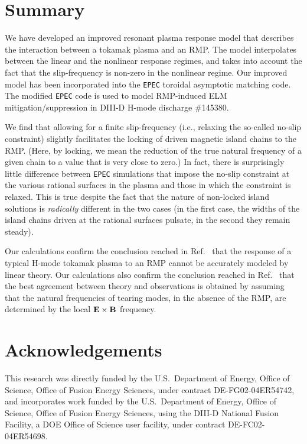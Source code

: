 \documentclass[12pt,prb,aps]{revtex4-1}
\begin{document}
\section{Summary}
We have developed an improved resonant plasma response model that describes the interaction between a tokamak plasma and an RMP. 
The model interpolates between the linear and the nonlinear response regimes, and takes into account the fact that the slip-frequency
is non-zero in the nonlinear regime. Our improved model has been incorporated into the {\tt EPEC} toroidal asymptotic matching code.\cite{rftor1}
The modified {\tt EPEC} code is used to model RMP-induced ELM mitigation/suppression in DIII-D H-mode discharge \#145380. 

We find that allowing for a finite slip-frequency (i.e., relaxing the so-called no-slip constraint) slightly facilitates the locking of
driven magnetic island chains to the RMP. (Here, by locking, we mean the reduction of the true natural frequency of a given chain to
a value that is very close to zero.) In fact, there is surprisingly little difference between {\tt EPEC} simulations that impose the
no-slip constraint at the various rational surfaces in the plasma and those in which the constraint is relaxed. This is true despite
the fact that the nature of non-locked island solutions is {\em radically}\/ different in the two cases (in the first case, the widths of the island
chains driven at the rational surfaces pulsate, in the second they remain steady). 

Our calculations  confirm the conclusion reached in Ref.~
that the response of a typical H-mode tokamak plasma to an RMP cannot be accurately modeled by linear theory. Our calculations also
confirm the conclusion reached in Ref.~ that the best agreement between theory and observations is obtained by assuming that the
natural frequencies of tearing modes, in the absence of the RMP, are determined by the local ${\bf E}\times{\bf B}$ frequency.

\section*{Acknowledgements}
This research was directly funded by the U.S.\ Department of Energy, Office of Science, Office of Fusion Energy Sciences,  under contract DE-FG02-04ER54742, and
incorporates work funded by the U.S.\ Department of Energy, Office of Science, Office of Fusion Energy Sciences, using the DIII-D National Fusion Facility, a DOE Office of Science user facility, under contract DE-FC02-04ER54698.  
\end{document}
